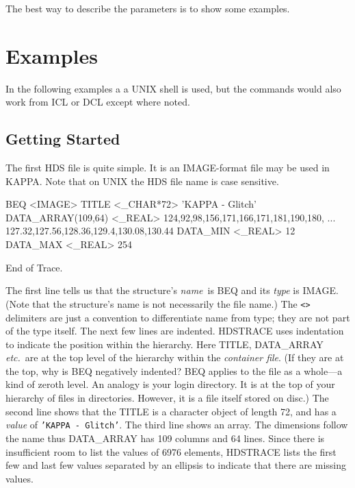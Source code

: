 \documentclass[11pt,nolof]{starlink}
\begin{document}
The best way to describe the parameters is to show some examples.

\section{Examples}
\label{se:example}
In the following examples a a UNIX shell is used, but the commands would
also work from ICL or DCL except where noted.

\subsection{Getting Started}
The first HDS file is quite simple.  It is an IMAGE-format file may be
used in {\footnotesize KAPPA}.  Note that on UNIX the HDS file name
is case sensitive.

\small
\begin{terminalv}

BEQ  <IMAGE>
  TITLE          <_CHAR*72>      'KAPPA - Glitch'
  DATA_ARRAY(109,64)  <_REAL>    124,92,98,156,171,166,171,181,190,180,
                                 ... 127.32,127.56,128.36,129.4,130.08,130.44
  DATA_MIN       <_REAL>         12
  DATA_MAX       <_REAL>         254

End of Trace.
\end{terminalv}
\normalsize
The first line tells us that the structure's \emph{name}\ is BEQ and its
\emph{type\/} is IMAGE.  (Note that the structure's name is not
necessarily the file name.)  The \texttt{<>} delimiters are just a
convention to differentiate name from type; they are not part of the
type itself.  The next few lines are indented.  {\footnotesize HDSTRACE}
uses indentation to indicate the position within the hierarchy.  Here
TITLE, DATA\_ARRAY \textit{etc.}\ are at the top level of the hierarchy
within the \emph{container file}.  (If they are at the top, why is BEQ
negatively indented?  BEQ applies to the file as a whole---a kind of
zeroth level. An analogy is your login directory.  It is at the top of
your hierarchy of files in directories.  However, it is a file itself
stored on disc.) The second line shows that the TITLE is a character
object of length 72, and has a \emph{value\/} of \texttt{'KAPPA - Glitch'}.
The third line shows an array.  The dimensions follow the name thus
DATA\_ARRAY has 109 columns and 64 lines.  Since there is insufficient
room to list the values of 6976 elements, {\footnotesize HDSTRACE} lists
the first few and last few values separated by an ellipsis to indicate
that there are missing values.
\end{document}
